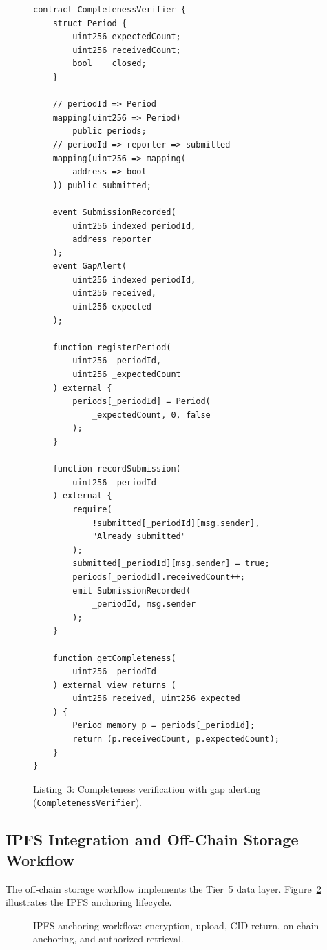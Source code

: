 \documentclass[AMA,LATO1COL]{WileyNJD-v2}
\begin{document}
\begin{figure}[!ht]
\begin{verbatim}
contract CompletenessVerifier {
    struct Period {
        uint256 expectedCount;
        uint256 receivedCount;
        bool    closed;
    }

    // periodId => Period
    mapping(uint256 => Period)
        public periods;
    // periodId => reporter => submitted
    mapping(uint256 => mapping(
        address => bool
    )) public submitted;

    event SubmissionRecorded(
        uint256 indexed periodId,
        address reporter
    );
    event GapAlert(
        uint256 indexed periodId,
        uint256 received,
        uint256 expected
    );

    function registerPeriod(
        uint256 _periodId,
        uint256 _expectedCount
    ) external {
        periods[_periodId] = Period(
            _expectedCount, 0, false
        );
    }

    function recordSubmission(
        uint256 _periodId
    ) external {
        require(
            !submitted[_periodId][msg.sender],
            "Already submitted"
        );
        submitted[_periodId][msg.sender] = true;
        periods[_periodId].receivedCount++;
        emit SubmissionRecorded(
            _periodId, msg.sender
        );
    }

    function getCompleteness(
        uint256 _periodId
    ) external view returns (
        uint256 received, uint256 expected
    ) {
        Period memory p = periods[_periodId];
        return (p.receivedCount, p.expectedCount);
    }
}
\end{verbatim}
\caption*{Listing~3: Completeness verification with gap alerting (\texttt{CompletenessVerifier}).}\label{lst:completeness}
\end{figure}

\subsection{IPFS Integration and Off-Chain Storage Workflow}\label{subsec:ipfs_impl}

The off-chain storage workflow implements the Tier~5 data layer. Figure~\ref{fig:ipfs_workflow} illustrates the IPFS anchoring lifecycle.

\begin{figure}[!ht]
\centering
{}
\caption{IPFS anchoring workflow: encryption, upload, CID return, on-chain anchoring, and authorized retrieval.}\label{fig:ipfs_workflow}
\end{figure}
\end{document}
